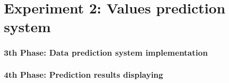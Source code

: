 \part{Experiment 2: Values prediction system}
\section{3th Phase: Data prediction system implementation}
\section{4th Phase: Prediction results displaying}
